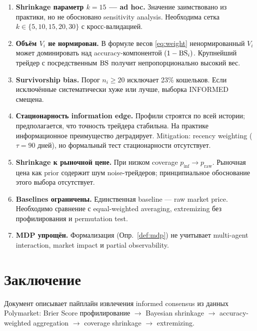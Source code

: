 \begin{enumerate}
  \item \textbf{Shrinkage параметр $k = 15$ --- ad hoc.}
    Значение заимствовано из практики, но не обосновано
    sensitivity analysis. Необходима сетка $k \in \{5, 10, 15, 20, 30\}$
    с кросс-валидацией.

  \item \textbf{Объём $V_i$ не нормирован.}
    В формуле весов \eqref{eq:weight} ненормированный $V_i$
    может доминировать над accuracy-компонентой $(1 - \mathrm{BS}_i)$.
    Крупнейший трейдер с посредственным $\mathrm{BS}$ получит
    непропорционально высокий вес.

  \item \textbf{Survivorship bias.}
    Порог $n_i \geq 20$ исключает 23\% кошельков.
    Если исключённые систематически хуже или лучше,
    выборка INFORMED смещена.

  \item \textbf{Стационарность information edge.}
    Профили строятся по всей истории; предполагается,
    что точность трейдера стабильна. На практике
    информационное преимущество деградирует.
    Mitigation: recency weighting ($\tau = 90$ дней),
    но формальный тест стационарности отсутствует.

  \item \textbf{Shrinkage к рыночной цене.}
    При низком coverage $p_{\mathrm{inf}} \to p_{\mathrm{raw}}$.
    Рыночная цена как prior содержит шум noise-трейдеров;
    принципиальное обоснование этого выбора отсутствует.

  \item \textbf{Baselines ограничены.}
    Единственная baseline --- raw market price.
    Необходимо сравнение с equal-weighted averaging,
    extremizing без профилирования и permutation test.

  \item \textbf{MDP упрощён.}
    Формализация (Опр.~\ref{def:mdp}) не учитывает
    multi-agent interaction, market impact и partial observability.
\end{enumerate}

\section{Заключение}
\label{sec:conclusion}

Документ описывает пайплайн извлечения informed consensus
из данных Polymarket: Brier Score профилирование $\to$
Bayesian shrinkage $\to$ accuracy-weighted aggregation $\to$
coverage shrinkage $\to$ extremizing.

